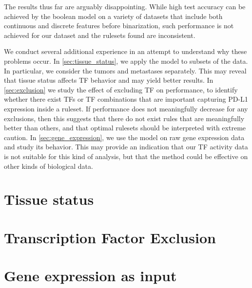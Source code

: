 The results thus far are arguably disappointing.
While high test accuracy can be achieved by the boolean model on a variety of
datasets that include both continuous and discrete features before binarization,
such performance is not achieved for our dataset and the rulesets found are inconsistent.

We conduct several additional experience in an attempt to understand why these problems occur.
In \autoref{sec:tissue_status}, we apply the model to subsets of the data.
In particular, we consider the tumors and metastases separately.
This may reveal that tissue status affects TF behavior and may yield better results.
In \autoref{sec:exclusion} we study the effect of excluding TF on performance, to identify
whether there exist TFs or TF combinations that are important capturing PD-L1 expression inside a ruleset.
If performance does not meaningfully decrease for any exclusions,
then this suggests that there do not exist rules that are meaningfully better than others,
and that optimal rulesets should be interpreted with extreme caution.
In \autoref{sec:gene_expression}, we use the model on raw gene expression data and study its behavior.
This may provide an indication that our TF activity data is not suitable for this kind of analysis,
but that the method could be effective on other kinds of biological data.

\section{Tissue status}\label{sec:tissue_status}


\clearpage

\section{Transcription Factor Exclusion}\label{sec:exclusion}


\section{Gene expression as input}\label{sec:gene_expression}



